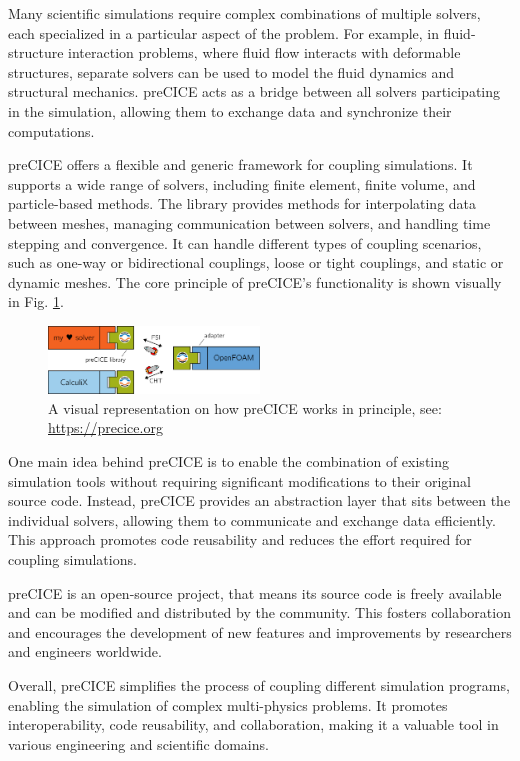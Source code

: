 \documentclass{eceasst}
\begin{document}
Many scientific simulations require complex combinations of multiple solvers, each specialized in a particular aspect of the problem.
For example, in fluid-structure interaction problems, where fluid flow interacts with deformable structures, separate solvers can be used to model the fluid dynamics and structural mechanics.
preCICE acts as a bridge between all solvers participating in the simulation, allowing them to exchange data and synchronize their computations.

preCICE offers a flexible and generic framework for coupling simulations.
It supports a wide range of solvers, including finite element, finite volume, and particle-based methods.
The library provides methods for interpolating data between meshes, managing communication between solvers, and handling time stepping and convergence.
It can handle different types of coupling scenarios, such as one-way or bidirectional couplings, loose or tight couplings, and static or dynamic meshes.
The core principle of preCICE's functionality is shown visually in Fig. \ref{fig:precice}.

\begin{figure}
    \centering
    \includegraphics[width=0.5\textwidth]{figures/precice.png}
    \caption{A visual representation on how preCICE works in principle, see: \url{https://precice.org}}
    \label{fig:precice}
\end{figure}

One main idea behind preCICE is to enable the combination of existing simulation tools without requiring significant modifications to their original source code.
Instead, preCICE provides an abstraction layer that sits between the individual solvers, allowing them to communicate and exchange data efficiently.
This approach promotes code reusability and reduces the effort required for coupling simulations.

preCICE is an open-source project, that means its source code is freely available and can be modified and distributed by the community.
This fosters collaboration and encourages the development of new features and improvements by researchers and engineers worldwide.

Overall, preCICE simplifies the process of coupling different simulation programs, enabling the simulation of complex multi-physics problems.
It promotes interoperability, code reusability, and collaboration, making it a valuable tool in various engineering and scientific domains.
\end{document}

